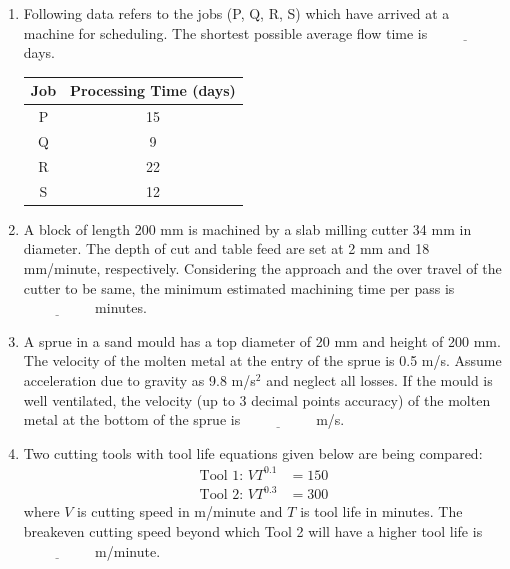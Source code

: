 \documentclass[journal]{IEEEtran}
\begin{document}
\begin{enumerate}[leftmargin=0pt]
    \item Following data refers to the jobs (P, Q, R, S) which have arrived at a machine for scheduling. The shortest possible average flow time is $\underline{\hspace{2cm}}$ days.
    \hfill{}

    \begin{tabular}{|c|c|}
        \hline
        Job & Processing Time (days) \\
        \hline
        P & 15 \\
        \hline
        Q & 9 \\
        \hline
        R & 22 \\
        \hline
        S & 12 \\
        \hline
    \end{tabular}

    \item A block of length 200 mm is machined by a slab milling cutter 34 mm in diameter. The depth of cut and table feed are set at 2 mm and 18 mm/minute, respectively. Considering the approach and the over travel of the cutter to be same, the minimum estimated machining time per pass is $\underline{\hspace{2cm}}$ minutes.\hfill{}

    \item A sprue in a sand mould has a top diameter of 20 mm and height of 200 mm. The velocity of the molten metal at the entry of the sprue is 0.5 m/s. Assume acceleration due to gravity as 9.8 m/s$^2$ and neglect all losses. If the mould is well ventilated, the velocity (up to 3 decimal points accuracy) of the molten metal at the bottom of the sprue is $\underline{\hspace{2cm}}$ m/s.
    \hfill{}

    \item Two cutting tools with tool life equations given below are being compared:
    \hfill{}
    \begin{align*}
        \text{Tool 1: } V T^{0.1} &= 150 \\
        \text{Tool 2: } V T^{0.3} &= 300
    \end{align*}
    where $V$ is cutting speed in m/minute and $T$ is tool life in minutes. The breakeven cutting speed beyond which Tool 2 will have a higher tool life is $\underline{\hspace{2cm}}$ m/minute.


\end{enumerate}
\end{document}
